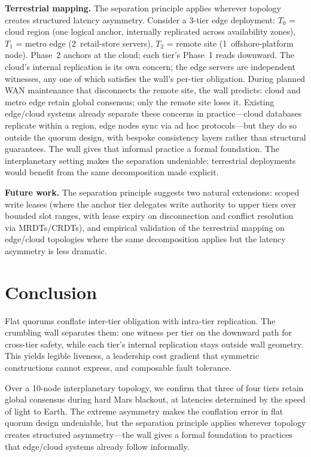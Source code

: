 \documentclass[11pt]{article}
\begin{document}
\textbf{Terrestrial mapping.} The separation principle applies wherever topology creates structured latency asymmetry. Consider a 3-tier edge deployment: $T_0$ = cloud region (one logical anchor, internally replicated across availability zones), $T_1$ = metro edge (2~retail-store servers), $T_2$ = remote site (1~offshore-platform node). Phase~2 anchors at the cloud; each tier's Phase~1 reads downward. The cloud's internal replication is its own concern; the edge servers are independent witnesses, any one of which satisfies the wall's per-tier obligation. During planned WAN maintenance that disconnects the remote site, the wall predicts: cloud and metro edge retain global consensus; only the remote site loses it. Existing edge/cloud systems already separate these concerns in practice---cloud databases replicate within a region, edge nodes sync via ad hoc protocols---but they do so outside the quorum design, with bespoke consistency layers rather than structural guarantees. The wall gives that informal practice a formal foundation. The interplanetary setting makes the separation undeniable; terrestrial deployments would benefit from the same decomposition made explicit.

\textbf{Future work.} The separation principle suggests two natural extensions: scoped write leases (where the anchor tier delegates write authority to upper tiers over bounded slot ranges, with lease expiry on disconnection and conflict resolution via MRDTs/CRDTs), and empirical validation of the terrestrial mapping on edge/cloud topologies where the same decomposition applies but the latency asymmetry is less dramatic.


\section{Conclusion}

Flat quorums conflate inter-tier obligation with intra-tier replication. The crumbling wall separates them: one witness per tier on the downward path for cross-tier safety, while each tier's internal replication stays outside wall geometry. This yields legible liveness, a leadership cost gradient that symmetric constructions cannot express, and composable fault tolerance.

Over a 10-node interplanetary topology, we confirm that three of four tiers retain global consensus during hard Mars blackout, at latencies determined by the speed of light to Earth. The extreme asymmetry makes the conflation error in flat quorum design undeniable, but the separation principle applies wherever topology creates structured asymmetry---the wall gives a formal foundation to practices that edge/cloud systems already follow informally.
\end{document}
